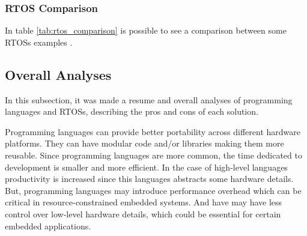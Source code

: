 \subsubsection{RTOS Comparison}
In table \ref{tab:rtos_comparison} is possible to see a comparison between some \glspl{RTOS} examples \cite{compRTOS}.
\begin{table}[H]
    \centering
    \caption{Comparison of Real-Time Operating Systems}
    \label{tab:rtos_comparison}
\end{table}


\subsection{Overall Analyses}
In this subsection, it was made a resume and overall analyses of programming languages and \glspl{RTOS}, describing the pros and cons of each solution.

Programming languages can provide better portability across different hardware platforms.
They can have modular code and/or libraries making them more reusable.
Since programming languages are more common, the time dedicated to development is smaller and more efficient.
In the case of high-level languages productivity is increased since this languages abstracts some hardware details.
But, programming languages may introduce performance overhead which can be critical in resource-constrained embedded systems.
And have may have less control over low-level hardware details, which could be essential for certain embedded applications.


